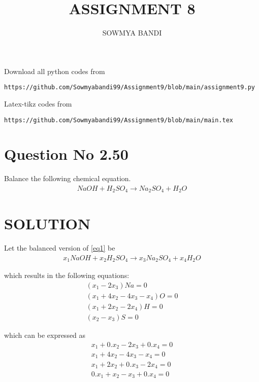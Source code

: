 \documentclass[journal,12pt,twocolumn]{IEEEtran}
\begin{document}
     \def\rightbox#1{\makebox[0in][r]{#1}}
     \def\centbox#1{\makebox[0in]{#1}}
     \def\topbox#1{\raisebox{-\baselineskip}[0in][0in]{#1}}
     \def\midbox#1{\raisebox{-0.5\baselineskip}[0in][0in]{#1}}
\vspace{3cm}
\title{ASSIGNMENT 8}
\author{SOWMYA BANDI}
\maketitle
\newpage
\bigskip
\renewcommand{\thefigure}{\theenumi}
\renewcommand{\thetable}{\theenumi}
Download all python codes from 
%
\begin{lstlisting}
https://github.com/Sowmyabandi99/Assignment9/blob/main/assignment9.py
\end{lstlisting}
%
Latex-tikz codes from 
%
\begin{lstlisting}
https://github.com/Sowmyabandi99/Assignment9/blob/main/main.tex
\end{lstlisting}
%
\section{Question No 2.50}
Balance the following chemical equation.
\begin{align}
NaOH + H_2SO_4 \xrightarrow{} Na_2SO_4 + H_2O \label{eq1}
\end{align}
%
\section{SOLUTION} 
Let the balanced version of \eqref{eq1} be
\begin{align}
   x_{1}NaOH + x_{2}H_2SO_4 \xrightarrow{} 
   x_{3}Na_2SO_4 + x_{4}H_2O \label{eq2}
\end{align}

which results in the following equations:
\begin{align}
    (x_{1}-2x_{3}) Na= 0\\
    (x_{1}+4x_{2}-4x_{3}-x_{4}) O= 0\\
    (x_{1}+2x_{2}-2x_{4}) H=0\\
    (x_{2}-x_{3}) S= 0
\end{align}

which can be expressed as
\begin{align}
    x_{1}+ 0.x_{2}- 2x_{3}+ 0.x_{4} = 0\\
    x_{1}+ 4x_{2}- 4x_{3}- x_{4} = 0\\
    x_{1}+ 2x_{2}+ 0.x_{3}- 2x_{4} = 0\\
    0.x_{1}+ x_{2}- x_{3}+ 0.x_{4} = 0
\end{align}
\end{document}
